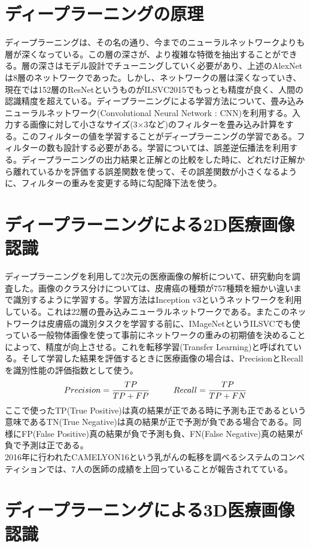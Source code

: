 \documentclass[a4j,10pt,oneside,openany]{jsbook}
\begin{document}
\section{ディープラーニングの原理}
ディープラーニングは、その名の通り、今までのニューラルネットワークよりも層が深くなっている。この層の深さが、より複雑な特徴を抽出することができる。層の深さはモデル設計でチューニングしていく必要があり、上述のAlexNetは8層のネットワークであった。しかし、ネットワークの層は深くなっていき、現在では152層のResNetというものがILSVC2015でもっとも精度が良く、人間の認識精度を超えている。ディープラーニングによる学習方法について、畳み込みニューラルネットワーク(Convolutional Neural Network : CNN)を利用する。入力する画像に対して小さなサイズ(3×3など)のフィルターを畳み込み計算をする。このフィルターの値を学習することがディープラーニングの学習である。フィルターの数も設計する必要がある。学習については、誤差逆伝播法を利用する。ディープラーニングの出力結果と正解との比較をした時に、どれだけ正解から離れているかを評価する誤差関数を使って、その誤差関数が小さくなるように、フィルターの重みを変更する時に勾配降下法を使う。
\section{ディープラーニングによる2D医療画像認識}
ディープラーニングを利用して2次元の医療画像の解析について、研究動向を調査した。画像のクラス分けについては、皮膚癌の種類が757種類を細かい違いまで識別するように学習する。学習方法はInception v3というネットワークを利用している。これは22層の畳み込みニューラルネットワークである。またこのネットワークは皮膚癌の識別タスクを学習する前に、IMageNetというILSVCでも使っている一般物体画像を使って事前にネットワークの重みの初期値を決めることによって、精度が向上させる。これを転移学習(Transfer Learning)と呼ばれている。そして学習した結果を評価するときに医療画像の場合は、PrecisionとRecallを識別性能の評価指数として使う。\[ Precision = \frac{TP}{TP+FP}\hspace{10mm} Recall = \frac{TP}{TP+FN} \]ここで使ったTP(True Positive)は真の結果が正である時に予測も正であるという意味であるTN(True Negative)は真の結果が正で予測が負である場合である。同様にFP(False Positive)真の結果が負で予測も負、FN(False Negative)真の結果が負で予測は正である。\\
2016年に行われたCAMELYON16という乳がんの転移を調べるシステムのコンペティションでは、7人の医師の成績を上回っていることが報告されてている。
\section{ディープラーニングによる3D医療画像認識}
\end{document}
